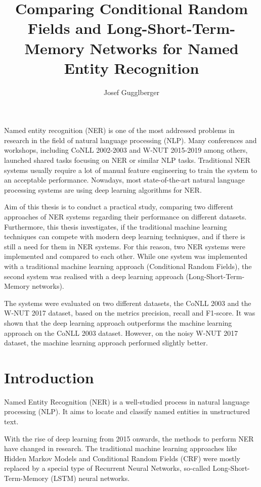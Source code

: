 \documentclass[12pt]{book}
\begin{document}
    \title{Comparing Conditional Random Fields and Long-Short-Term-Memory Networks for Named Entity Recognition}
    \author{Josef Gugglberger}
    \beforepreface
    
    Named entity recognition (NER) is one of the most addressed problems in research in the field of natural language processing (NLP). Many conferences and workshops, including CoNLL 2002-2003 and W-NUT 2015-2019 among others, launched shared tasks focusing on NER or similar NLP tasks. Traditional NER systems usually require a lot of manual feature engineering to train the system to an acceptable performance. Nowadays, most state-of-the-art natural language processing systems are using deep learning algorithms for NER. 
    
    Aim of this thesis is to conduct a practical study, comparing two different approaches of NER systems regarding their performance on different datasets. Furthermore, this thesis investigates, if the traditional machine learning techniques can compete with modern deep learning techniques, and if there is still a need for them in NER systems. For this reason, two NER systems were implemented and compared to each other. While one system was implemented with a traditional machine learning approach (Conditional Random Fields), the second system was realised with a deep learning approach (Long-Short-Term-Memory networks).
    
    The systems were evaluated on two different datasets, the CoNLL 2003 and the W-NUT 2017 dataset, based on the metrics precision, recall and F1-score.
    It was shown that the deep learning approach outperforms the machine learning approach on the CoNLL 2003 dataset. However, on the noisy W-NUT 2017 dataset, the machine learning approach performed slightly better.

 	\afterpreface
 	
 	
    \chapter{Introduction}
    
    Named Entity Recognition (NER) is a well-studied process in natural language processing (NLP). It aims to locate and classify named entities in unstructured text.
    
    With the rise of deep learning from 2015 onwards, the methods to perform NER have changed in research. The traditional machine learning approaches like Hidden Markov Models and Conditional Random Fields (CRF) were mostly replaced by a special type of Recurrent Neural Networks, so-called Long-Short-Term-Memory (LSTM) neural networks. 
    
\end{document}

